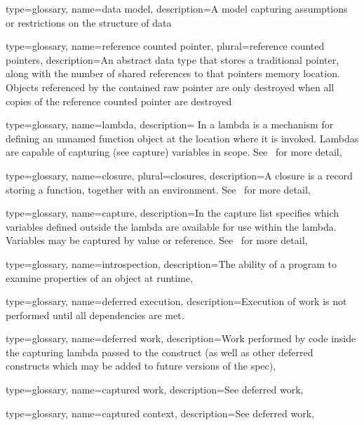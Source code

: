 {
  type=glossary,
  name={data model},
  description={A model capturing assumptions or restrictions on the structure of data}
}


{
  type=glossary,
  name={reference counted pointer},
  plural={reference counted pointers},
  description={An abstract data type that stores a traditional pointer, along
    with the number of shared references to that pointers
    memory location.  Objects referenced by the contained raw pointer are only
     destroyed when all copies of the reference counted pointer are destroyed} 
}

{
  type=glossary,
  name={lambda},
  description={ In \CC{} a lambda is a mechanism for 
    defining an unnamed function object at the location 
    where it is invoked. Lambdas are capable of capturing (see \gls{capture}) variables in
    scope. See~\cite{lambda} for more detail},
}

{
  type={glossary},
  name={closure},
  plural={closures},
  description={A closure is a record storing a function, together with an
    environment.  See~\cite{closure} for more detail},
}

{
  type=glossary,
  name=capture,
  description={In \CC{} the capture list specifies which variables defined
    outside the lambda are available for use within the lambda. Variables may
    be captured by value or reference.  See~\cite{lambda} for more detail},
}

{
  type=glossary,
  name=introspection,
  description={The ability of a program to examine properties of an object at
    runtime},
}

{
  type=glossary,
  name={deferred execution},
  description={Execution of work is not performed until all dependencies are
    met.}
  }

{
  type=glossary,
  name={deferred work},
  description={Work
performed by code inside the capturing lambda passed to the
 construct (as well as other deferred constructs which
may be added to future versions of the spec)},
}


{
  type=glossary,
  name={captured work},
  description={See \gls{deferred work}},
}

{
  type=glossary,
  name={captured context},
  description={See \gls{deferred work}},
}

